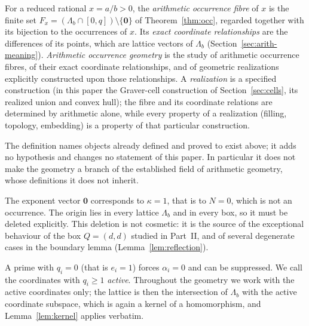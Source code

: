 \begin{definition}\label{def:aog}
For a reduced rational $x=a/b>0$, the \emph{arithmetic occurrence fibre} of $x$ is the finite set $F_x=(\Lambda_b\cap[0,q])\setminus\{\mathbf0\}$ of Theorem~\ref{thm:occ}, regarded together with its bijection to the occurrences of $x$. Its \emph{exact coordinate relationships} are the differences of its points, which are lattice vectors of $\Lambda_b$ (Section~\ref{sec:arith-meaning}). \emph{Arithmetic occurrence geometry} is the study of arithmetic occurrence fibres, of their exact coordinate relationships, and of geometric realizations explicitly constructed upon those relationships. A \emph{realization} is a specified construction (in this paper the Graver-cell construction of Section~\ref{sec:cells}, its realized union and convex hull); the fibre and its coordinate relations are determined by arithmetic alone, while every property of a realization (filling, topology, embedding) is a property of that particular construction.
\end{definition}

\begin{remark}
The definition names objects already defined and proved to exist above; it adds no hypothesis and changes no statement of this paper. In particular it does not make the geometry a branch of the established field of arithmetic geometry, whose definitions it does not inherit.
\end{remark}

\begin{remark}\label{rem:origin}
The exponent vector $\mathbf0$ corresponds to $\kappa=1$, that is to $N=0$, which is not an occurrence. The origin lies in every lattice $\Lambda_b$ and in every box, so it must be deleted explicitly. This deletion is not cosmetic: it is the source of the exceptional behaviour of the box $Q=(d,d)$ studied in Part~II, and of several degenerate cases in the boundary lemma (Lemma~\ref{lem:reflection}).
\end{remark}

\begin{remark}
A prime with $q_i=0$ (that is $e_i=1$) forces $\alpha_i=0$ and can be suppressed. We call the coordinates with $q_i\ge1$ \emph{active}. Throughout the geometry we work with the active coordinates only; the lattice is then the intersection of $\Lambda_b$ with the active coordinate subspace, which is again a kernel of a homomorphism, and Lemma~\ref{lem:kernel} applies verbatim.
\end{remark}

